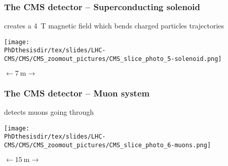 \begin{frame}\addtocounter{framenumber}{-1}
\frametitle{The CMS detector -- Superconducting solenoid}
\begin{center}
creates a \SI{4}{\tesla} magnetic field which bends charged particles trajectories

\vfill

\texttt{[image: \\PhDthesisdir/tex/slides/LHC-CMS/CMS/CMS\_zoomout\_pictures/CMS\_slice\_photo\_5-solenoid.png]}

\vfill

$\longleftarrow \SI{7}{\meter} \longrightarrow$
\end{center}
\end{frame}
\begin{frame}\addtocounter{framenumber}{-1}
\frametitle{The CMS detector -- Muon system}
\begin{center}
detects muons going through

\vfill

\texttt{[image: \\PhDthesisdir/tex/slides/LHC-CMS/CMS/CMS\_zoomout\_pictures/CMS\_slice\_photo\_6-muons.png]}

\vfill

$\longleftarrow \SI{15}{\meter} \longrightarrow$
\end{center}
\end{frame}